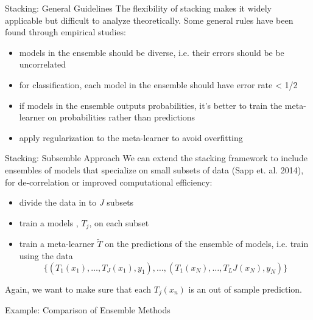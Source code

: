 \documentclass[12pt,t]{beamer}
\begin{document}
\begin{frame}{Stacking: General Guidelines} 
\vskip-0.4cm
The flexibility of stacking makes it widely applicable but difficult to analyze theoretically. Some general rules have been found through empirical studies:
\vskip0.2cm
\begin{itemize}
\item models in the ensemble should be diverse, i.e. their errors should be be uncorrelated
\vskip0.2cm
\item for classification, each model in the ensemble should have error rate < 1/2
\vskip0.2cm
\item if models in the ensemble outputs probabilities, it's better to train the meta-learner on probabilities rather than predictions
\vskip0.2cm
\item apply regularization to the meta-learner to avoid overfitting
\end{itemize}
\end{frame}

\begin{frame}{Stacking: Subsemble Approach} 
\vskip-0.4cm
We can extend the stacking framework to include ensembles of models that specialize on small subsets of data (Sapp et. al. 2014), for de-correlation or improved computational efficiency:
\vskip0.2cm
\begin{itemize}
\item divide the data in to $J$ subsets
\item train a models , $T_j$, on each subset
\vskip0.2cm
\item train a meta-learner $\widetilde{T}$ on the predictions of the ensemble of models, i.e. train using the data
\[
\{(T_1(x_1), \ldots, T_J(x_1), y_1), \ldots, (T_1(x_N), \ldots, T_LJ(x_N), y_N)\}
\]
\end{itemize}
\vskip0.2cm
Again, we want to make sure that each $T_j(x_n)$ is an out of sample prediction. 
\end{frame}

\begin{frame}{Example: Comparison of Ensemble Methods} 

\end{frame}
\end{document}
